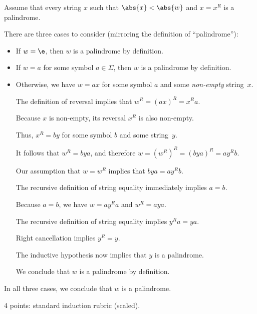 \documentclass[11pt]{article}
\begin{document}
\begin{enumerate}
\begin{enumerate}
\begin{Solution}
Assume that every string $x$ such that $\abs{x} < \abs{w}$ and $x = x^R$ is a palindrome.

There are three cases to consider (mirroring the definition of “palindrome”):
\begin{itemize}\parskip0.25ex
\item 
If $w = \e$, then $w$ is a palindrome by definition.

\item 
If $w = a$ for some symbol $a\in\Sigma$, then $w$ is a palindrome by definition.

\item
Otherwise, we have $w = ax$ for some symbol $a$ and some \emph{non-empty} string~$x$.
  
The definition of reversal implies that $w^R = (ax)^R = x^R a$.

Because $x$ is non-empty, its reversal $x^R$ is also non-empty.

Thus, $x^R = by$ for some symbol $b$ and some string~$y$.

It follows that $w^R = bya$, and therefore $w = (w^R)^R = (bya)^R = a y^R b$.

\medskip
{}
\medskip

Our assumption that $w = w^R$ implies that $bya = a y^R b$.

The recursive definition of string equality immediately implies $a=b$.

\medskip
Because $a=b$, we have $w = ay^Ra$ and $w^R = a y a$.

The recursive definition of string equality implies $y^Ra = ya$.

Right cancellation implies $y^R = y$.

The inductive hypothesis now implies that $y$ is a palindrome.

\medskip
We conclude that $w$ is a palindrome by definition.
\end{itemize}
In all three cases, we conclude that $w$ is a palindrome.\needqedtrue\EOS
\end{Solution}
\unskip
\begin{rubric}
4 points: standard induction rubric (scaled).
\end{rubric}

\end{enumerate}




\end{enumerate}
\end{document}
